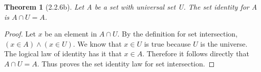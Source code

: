 \documentclass[a4paper, 12pt]{article}
\theoremstyle{plain}
\newtheorem*{theorem*}{Theorem}
\begin{document}
	
	\begin{theorem*}[2.2.6b]
		Let A be a set with universal set U. The set identity for A is $A \cap U = A$.
	\end{theorem*}
	
	\begin{proof}
		Let $x$ be an element in $A \cap U$. By the definition for set intersection, $(x \in A) \land (x \in U)$. We know that $x \in U$ is true because $U$ is the universe. The logical law of identity has it that $x \in A$. Therefore it follows directly that $A \cap U = A$. Thus proves the set identity law for set intersection.
	\end{proof}
\end{document}
